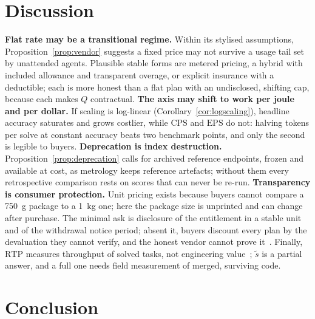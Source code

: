 \documentclass[conference]{IEEEtran}
\theoremstyle{plain}
\theoremstyle{definition}
\newcommand{\RTP}{\ensuremath{\mathrm{RTP}}}
\newcommand{\CPS}{\ensuremath{\mathrm{CPS}}}
\newcommand{\EPS}{\ensuremath{\mathrm{EPS}}}
\begin{document}
\section{Discussion}
\label{sec:discussion}

\textbf{Flat rate may be a transitional regime.} Within its stylised
assumptions, Proposition~\ref{prop:vendor} suggests a fixed price may not
survive a usage tail set by unattended agents. Plausible stable forms are
metered pricing, a hybrid with included allowance and transparent
overage, or explicit insurance with a deductible; each is more honest than a
flat plan with an undisclosed, shifting cap, because each makes $Q$
contractual. \textbf{The axis may shift to work per joule and per dollar.} If scaling is
log-linear (Corollary~\ref{cor:logscaling}), headline accuracy saturates and
grows costlier, while $\CPS$ and $\EPS$ do not: halving tokens per solve at constant accuracy
beats two benchmark points, and only the second is legible to buyers.
\textbf{Deprecation is index destruction.} Proposition~\ref{prop:deprecation}
calls for archived reference endpoints, frozen and available at cost, as
metrology keeps reference artefacts; without them every retrospective
comparison rests on scores that can never be re-run. \textbf{Transparency is
consumer protection.} Unit pricing exists because buyers cannot compare a
\SI{750}{\gram} package to a \SI{1}{\kilogram} one; here the package size is
unprinted and can change after purchase. The minimal ask is disclosure of the
entitlement in a stable unit and of the withdrawal notice period; absent it,
buyers discount every plan by the devaluation they cannot verify, and the
honest vendor cannot prove it~\cite{akerlof1970lemons}. Finally, $\RTP$
measures throughput of solved tasks, not engineering value~\cite{metr2025slowdown};
$\tilde s$ is a partial answer, and a full one needs field measurement of
merged, surviving code.

\section{Conclusion}
\end{document}
